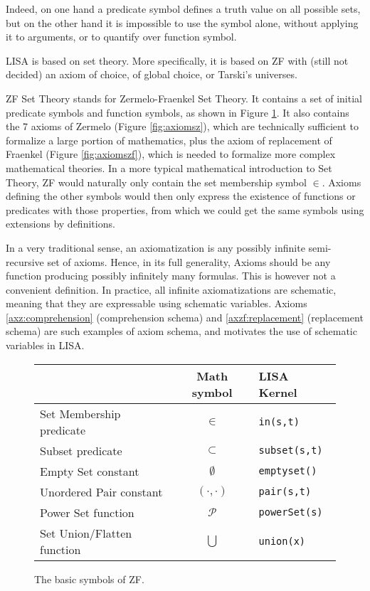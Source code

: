 Indeed, on one hand a predicate symbol defines a truth value on all possible sets, but on the other hand it is impossible to use the symbol alone, without applying it to arguments, or to quantify over function symbol.

LISA is based on set theory. More specifically, it is based on ZF with (still not decided) an axiom of choice, of global choice, or Tarski's universes.

ZF Set Theory stands for Zermelo-Fraenkel Set Theory. It contains a set of initial predicate symbols and function symbols, as shown in Figure \ref{fig:symbolszf}. It also contains the 7 axioms of Zermelo (Figure \ref{fig:axiomsz}), which are technically sufficient to formalize a large portion of mathematics, plus the axiom of replacement of Fraenkel (Figure \ref{fig:axiomszf}), which is needed to formalize more complex mathematical theories.
In a more typical mathematical introduction to Set Theory, ZF would naturally only contain the set membership symbol $\in$. Axioms defining the other symbols would then only express the existence of functions or predicates with those properties, from which we could get the same symbols using extensions by definitions.

In a very traditional sense, an axiomatization is any possibly infinite semi-recursive set of axioms. Hence, in its full generality, Axioms should be any function producing possibly infinitely many formulas.
This is however not a convenient definition. In practice, all infinite axiomatizations are schematic, meaning that they are expressable using schematic variables. Axioms \ref{axz:comprehension} (comprehension schema) and \ref{axzf:replacement} (replacement schema) are such examples of axiom schema, and motivates the use of schematic variables in LISA.



\begin{figure}
  \begin{center}
    \begin{tabular}{l|c|l}
      {}                         & Math symbol       & LISA Kernel             \\ \hline
      Set Membership predicate   & $\in$             & \lstinline$in(s,t)$     \\
      Subset predicate           & $\subset$         & \lstinline$subset(s,t)$ \\
      Empty Set constant         & $\emptyset$       & \lstinline$emptyset()$  \\
      Unordered Pair constant    & $(\cdot, \cdot )$ & \lstinline$pair(s,t)$   \\
      Power Set function         & $\mathcal P$      & \lstinline$powerSet(s)$ \\
      Set Union/Flatten function & $\bigcup$         & \lstinline$union(x)$    \\
    \end{tabular}

    \caption{The basic symbols of ZF.}
    \label{fig:symbolszf}
  \end{center}
\end{figure}


